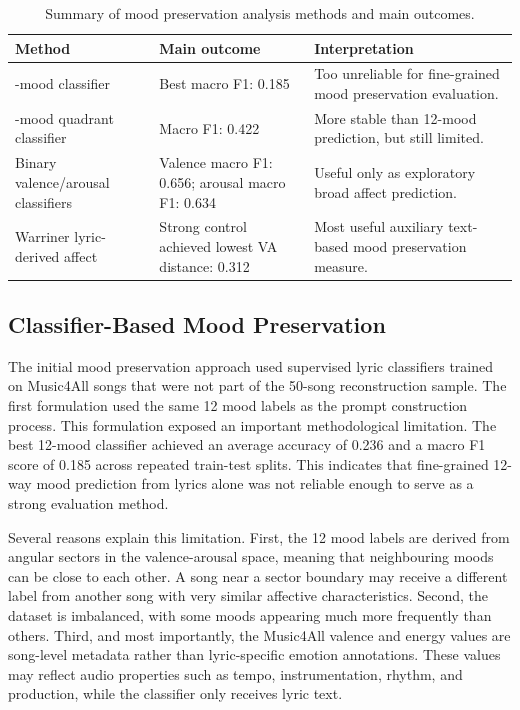 \begin{table}[H]
\centering
\renewcommand{\arraystretch}{1.2}
\caption{Summary of mood preservation analysis methods and main outcomes.}
\label{tab:mood_preservation_summary}
\begin{tabular}{
>{\raggedright\arraybackslash}p{}
>{\raggedright\arraybackslash}p{}
>{\raggedright\arraybackslash}p{}
}
\hline
Method & Main outcome & Interpretation \\
\hline
12-mood classifier & Best macro F1: 0.185 & Too unreliable for fine-grained mood preservation evaluation. \\
4-mood quadrant classifier & Macro F1: 0.422 & More stable than 12-mood prediction, but still limited. \\
Binary valence/arousal classifiers & Valence macro F1: 0.656; arousal macro F1: 0.634 & Useful only as exploratory broad affect prediction. \\
Warriner lyric-derived affect & Strong control achieved lowest VA distance: 0.312 & Most useful auxiliary text-based mood preservation measure. \\
\hline
\end{tabular}
\renewcommand{\arraystretch}{1.0}
\end{table}

\subsection{Classifier-Based Mood Preservation}

The initial mood preservation approach used supervised lyric classifiers trained on Music4All songs that were not part of the 50-song reconstruction sample. The first formulation used the same 12 mood labels as the prompt construction process. This formulation exposed an important methodological limitation. The best 12-mood classifier achieved an average accuracy of 0.236 and a macro F1 score of 0.185 across repeated train-test splits. This indicates that fine-grained 12-way mood prediction from lyrics alone was not reliable enough to serve as a strong evaluation method.

Several reasons explain this limitation. First, the 12 mood labels are derived from angular sectors in the valence-arousal space, meaning that neighbouring moods can be close to each other. A song near a sector boundary may receive a different label from another song with very similar affective characteristics. Second, the dataset is imbalanced, with some moods appearing much more frequently than others. Third, and most importantly, the Music4All valence and energy values are song-level metadata rather than lyric-specific emotion annotations. These values may reflect audio properties such as tempo, instrumentation, rhythm, and production, while the classifier only receives lyric text.

